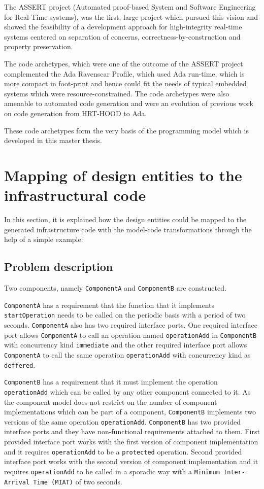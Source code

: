 The ASSERT project (Automated proof-based System and Software Engineering for Real-Time systems), was the first, large project which pursued this vision and showed the feasibility of a development approach for high-integrity real-time systems centered on separation of concerns, correctness-by-construction and property preservation.

The code archetypes, which were one of the outcome of the ASSERT project complemented the Ada Ravenscar Profile, which used Ada run-time, which is more compact in foot-print and hence could fit the needs of typical embedded systems which were resource-constrained. The code archetypes were also amenable to automated code generation and were an evolution of previous work on code generation from HRT-HOOD to Ada.

These code archetypes form the very basis of the programming model which is developed in this master thesis.

\section{Mapping of design entities to the infrastructural code}    
In this section, it is explained how the design entities could be mapped to the generated infrastructure code with the model-code transformations through the help of a simple example:

\subsection{Problem description}
Two components, namely \texttt{ComponentA} and \texttt{ComponentB} are constructed. 

\texttt{ComponentA} has a requirement that the function that it implements \texttt{startOperation} needs to be called on the periodic basis with a period of two seconds. \texttt{ComponentA} also has two required interface ports. One required interface port allows \texttt{ComponentA} to call an operation named \texttt{operationAdd} in \texttt{ComponentB} with concurrency kind \texttt{immediate} and the other required interface port allows \texttt{ComponentA} to call the same operation \texttt{operationAdd} with concurrency kind as \texttt{deffered}. 

\texttt{ComponentB} has a requirement that it must implement the operation \texttt{operationAdd} which can be called by any other component connected to it. As the component model does not restrict on the number of component implementations which can be part of a component, \texttt{ComponentB} implements two versions of the same operation \texttt{operationAdd}. \texttt{ComponentB} has two provided interface ports and they have non-functional requirements attached to them. First provided interface port works with the first version of component implementation and it requires \texttt{operationAdd} to be a \texttt{protected} operation. Second provided interface port works with the second version of component implementation and it requires \texttt{operationAdd} to be called in a sporadic way with a \texttt{Minimum Inter-Arrival Time (MIAT)} of two seconds.

 


 